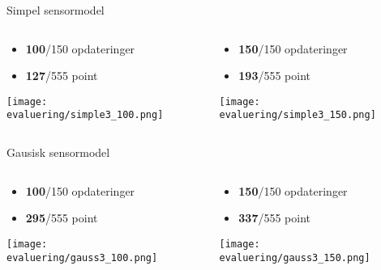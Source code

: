 \begin{frame}[fragile]{Simpel sensormodel}
	\begin{columns}
		\begin{column}{0.5\textwidth}
			\begin{itemize}
			\item \textbf{100}/150 opdateringer
			\item \textbf{127}/555 point
			\end{itemize}
			\texttt{[image: evaluering/simple3\_100.png]}
		\end{column}
		\begin{column}{0.5\textwidth}
			\begin{itemize}
			\item \textbf{150}/150 opdateringer
			\item \textbf{193}/555 point
			\end{itemize}
			\texttt{[image: evaluering/simple3\_150.png]}
		\end{column}
\end{columns}
\end{frame}

\begin{frame}[fragile]{Gausisk sensormodel}
	\begin{columns}
		\begin{column}{0.5\textwidth}
			\begin{itemize}
			\item \textbf{100}/150 opdateringer
			\item \textbf{295}/555 point
			\end{itemize}
			\texttt{[image: evaluering/gauss3\_100.png]}
		\end{column}
		\begin{column}{0.5\textwidth}
			\begin{itemize}
			\item \textbf{150}/150 opdateringer
			\item \textbf{337}/555 point
			\end{itemize}
			\texttt{[image: evaluering/gauss3\_150.png]}
		\end{column}
\end{columns}
\end{frame}


